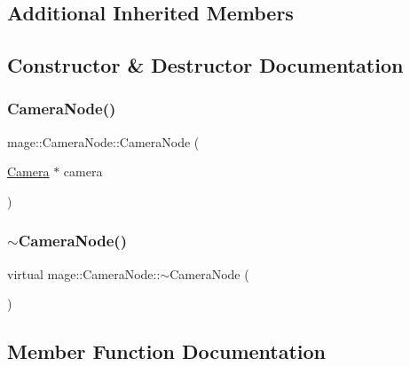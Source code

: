 \subsection*{Additional Inherited Members}


\subsection{Constructor \& Destructor Documentation}
\hypertarget{classmage_1_1_camera_node_a6e1a32bd7a1c8cae09439f0922a5192a}{}\label{classmage_1_1_camera_node_a6e1a32bd7a1c8cae09439f0922a5192a} 
\subsubsection{\texorpdfstring{Camera\+Node()}{CameraNode()}}
{\footnotesize\ttfamily mage\+::\+Camera\+Node\+::\+Camera\+Node (\begin{DoxyParamCaption}\item[{\hyperlink{classmage_1_1_camera}{Camera} $\ast$}]{camera }\end{DoxyParamCaption})}

\hypertarget{classmage_1_1_camera_node_a2b66360b99bf03ee2f66a3a74be31792}{}\label{classmage_1_1_camera_node_a2b66360b99bf03ee2f66a3a74be31792} 
\subsubsection{\texorpdfstring{$\sim$\+Camera\+Node()}{~CameraNode()}}
{\footnotesize\ttfamily virtual mage\+::\+Camera\+Node\+::$\sim$\+Camera\+Node (\begin{DoxyParamCaption}{ }\end{DoxyParamCaption})\hspace{0.3cm}{\ttfamily [virtual]}}



\subsection{Member Function Documentation}
\hypertarget{classmage_1_1_camera_node_a7cd05fd41271259870483de5b3ed6ebe}{}\label{classmage_1_1_camera_node_a7cd05fd41271259870483de5b3ed6ebe} 
